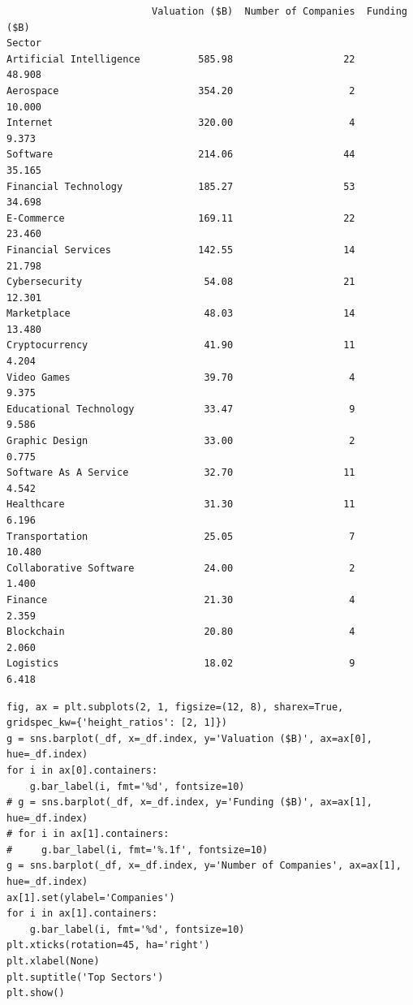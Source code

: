 \documentclass[a4paper,12pt]{article}
\begin{document}
\label{}
\begin{verbatim}
                         Valuation ($B)  Number of Companies  Funding ($B)
Sector
Artificial Intelligence          585.98                   22        48.908
Aerospace                        354.20                    2        10.000
Internet                         320.00                    4         9.373
Software                         214.06                   44        35.165
Financial Technology             185.27                   53        34.698
E-Commerce                       169.11                   22        23.460
Financial Services               142.55                   14        21.798
Cybersecurity                     54.08                   21        12.301
Marketplace                       48.03                   14        13.480
Cryptocurrency                    41.90                   11         4.204
Video Games                       39.70                    4         9.375
Educational Technology            33.47                    9         9.586
Graphic Design                    33.00                    2         0.775
Software As A Service             32.70                   11         4.542
Healthcare                        31.30                   11         6.196
Transportation                    25.05                    7        10.480
Collaborative Software            24.00                    2         1.400
Finance                           21.30                    4         2.359
Blockchain                        20.80                    4         2.060
Logistics                         18.02                    9         6.418
\end{verbatim}

\begin{verbatim}
fig, ax = plt.subplots(2, 1, figsize=(12, 8), sharex=True, gridspec_kw={'height_ratios': [2, 1]})
g = sns.barplot(_df, x=_df.index, y='Valuation ($B)', ax=ax[0], hue=_df.index)
for i in ax[0].containers:
    g.bar_label(i, fmt='%d', fontsize=10)
# g = sns.barplot(_df, x=_df.index, y='Funding ($B)', ax=ax[1], hue=_df.index)
# for i in ax[1].containers:
#     g.bar_label(i, fmt='%.1f', fontsize=10)
g = sns.barplot(_df, x=_df.index, y='Number of Companies', ax=ax[1], hue=_df.index)
ax[1].set(ylabel='Companies')
for i in ax[1].containers:
    g.bar_label(i, fmt='%d', fontsize=10)
plt.xticks(rotation=45, ha='right')
plt.xlabel(None)
plt.suptitle('Top Sectors')
plt.show()
\end{verbatim}
\end{document}
